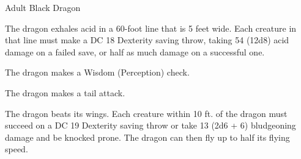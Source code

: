 \begin{monsterbox}{Adult Black Dragon}
\begin{monsteraction}
\end{monsteraction}
\begin{monsteraction}
The dragon exhales acid in a 60-foot line that is 5 feet wide. Each creature in that line must make a DC 18 Dexterity saving throw, taking 54 (12d8) acid damage on a failed save, or half as much damage on a successful one.
\end{monsteraction}
\begin{monsteraction}[Detect]
The dragon makes a Wisdom (Perception) check.
\end{monsteraction}
\begin{monsteraction}
The dragon makes a tail attack.
\end{monsteraction}
\begin{monsteraction}
The dragon beats its wings. Each creature within 10 ft. of the dragon must succeed on a DC 19 Dexterity saving throw or take 13 (2d6 + 6) bludgeoning damage and be knocked prone. The dragon can then fly up to half its flying speed.
\end{monsteraction}
\end{monsterbox}